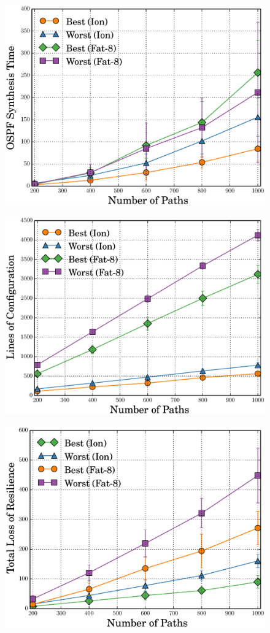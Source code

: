 \begin{figure}[t]
	\centering
	\includegraphics[width=0.7\columnwidth]{figures/ospfSynthesisTimeMCMC.eps}
	\label{fig:ospfmcmc}
\end{figure}


\begin{figure}[t]
	\centering
	\includegraphics[width=0.7\columnwidth]{figures/confMCMC.eps}
	\label{fig:confmcmc}
\end{figure}

\begin{figure}[t]
	\centering
	\includegraphics[width=0.7\columnwidth]{figures/TRLMCMC.eps}
	\label{fig:trlmcmc}
\end{figure}

